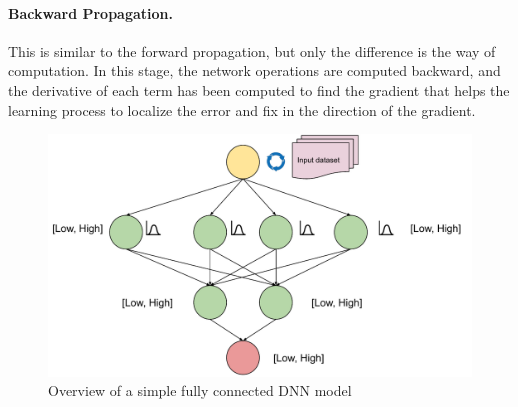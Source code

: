 \paragraph{Backward Propagation.} This is similar to the forward propagation, but only the difference is the way of computation. In this stage, the network operations are computed backward, and the derivative of each term has been computed to find the gradient that helps the learning process to localize the error and fix in the direction of the gradient.
\begin{figure}
	\includegraphics[width=\linewidth]{overview}
	\caption{Overview of a simple fully connected DNN model}
	\label{fig:rq5}
\end{figure}
